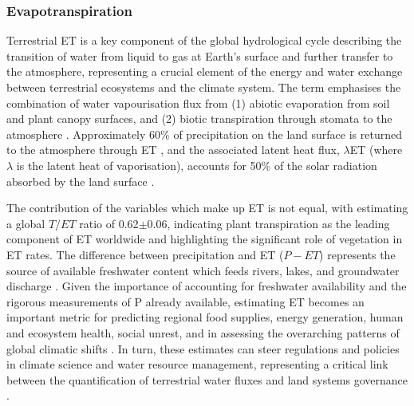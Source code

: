 \subsubsection{Evapotranspiration} 
Terrestrial \acl{ET} is a key component of the global hydrological cycle describing the transition of water from liquid to gas at Earth's surface and further transfer to the atmosphere, representing a crucial element of the energy and water exchange between terrestrial ecosystems and the climate system. The term emphasises the combination of water vapourisation flux from (1) abiotic evaporation from soil and plant canopy surfaces, and (2) biotic transpiration through stomata to the atmosphere \parencite{katul2012evapotranspiration}. Approximately 60\% of precipitation on the land surface is returned to the atmosphere through ET \parencite{oki2006global}, and the associated latent heat flux, $\lambda$ET (where $\lambda$ is the latent heat of vaporisation), accounts for 50\% of the solar radiation absorbed by the land surface \parencite{trenberth2009earth}.
\par The contribution of the variables which make up ET is not equal, with \textcite{lian2018partitioning} estimating a global $T/ET$ ratio of 0.62$\pm$0.06, indicating plant transpiration as the leading component of ET worldwide and highlighting the significant role of vegetation in ET rates. The difference between precipitation and ET ($P - ET$) represents the source of available freshwater content which feeds rivers, lakes, and groundwater discharge \parencite{swenson2006estimating}. Given the importance of accounting for freshwater availability and the rigorous measurements of P already available, estimating ET becomes an important metric for predicting regional food supplies, energy generation, human and ecosystem health, social unrest, and in assessing the overarching patterns of global climatic shifts \parencite{rodell2018emerging,amani2023review, xue2025review}. In turn, these estimates can steer regulations and policies in climate science and water resource management, representing a critical link between the quantification of terrestrial water fluxes and land systems governance \parencite{shi2024machine}.


